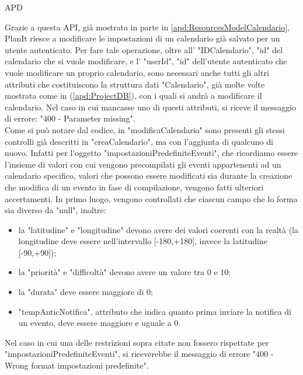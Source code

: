 \begin{listaPersonale} {APD}
\begin{listaPersonale2}[APD]{}
\begin{center}
                \end{center}
                Grazie a questa API, già mostrata in parte in \ref{apd:ResourcesModelCalendario}, PlanIt riesce a modificare le impostazioni di un calendario già salvato per un utente autenticato. Per fare tale operazione, oltre all' "IDCalendario", "id" del calendario che si vuole modificare, e l' "userId", "id" dell'utente autenticato che vuole modificare un proprio calendario, sono necessari anche tutti gli altri attributi che costituiscono la struttura dati "Calendario", già molte volte mostrata come in (\ref{apd:ProjectDB}), con i quali si andrà a modificare il calendario. Nel caso in cui mancasse uno di questi attributi, si riceve il messaggio di errore: "400 - Parameter missing". \\
                Come si può notare dal codice, in "modificaCalendario" sono presenti gli stessi controlli già descritti in "creaCalendario", ma con l'aggiunta di qualcuno di nuovo. Infatti per l'oggetto "impostazioniPredefiniteEventi", che ricordiamo essere l'insieme di valori con cui vengono precompilati gli eventi appartenenti ad un calendario specifico, valori che possono essere modificati sia durante la creazione che modifica di un evento in fase di compilazione, vengono fatti ulteriori accertamenti. In primo luogo, vengono controllati che ciascun campo che lo forma sia diverso da "null", inoltre:
                \begin{itemize}
                    \item la "latitudine" e "longitudine" devono avere dei valori coerenti con la realtà (la longitudine deve essere nell'intervallo [-180,+180], invece la latitudine [-90,+90]);
                    \item la "priorità" e "difficoltà" devono avere un valore tra 0 e 10;
                    \item la "durata" deve essere maggiore di 0;
                    \item "tempAnticNotifica", attributo che indica quanto prima inviare la notifica di un evento, deve essere maggiore e uguale a 0.
                \end{itemize}
                Nel caso in cui una delle restrizioni sopra citate non fossero rispettate per "impostazioniPredefiniteEventi", si riceverebbe il messaggio di errore "400 - Wrong format impostazioni predefinite". \\

\end{listaPersonale2}
\end{listaPersonale}
